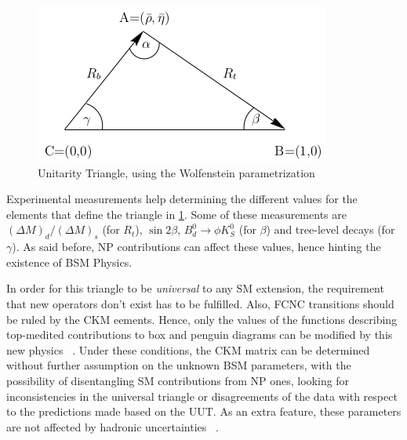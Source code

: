 \begin{figure} [htb!]
\begin{center}
\includegraphics[scale=0.7]{figs/uut.png}
\caption{Unitarity Triangle, using the Wolfenstein parametrization \label{fig:uut}}
\end{center}
\end{figure}

Experimental measurements help determining the different values for the elements that define the triangle in \ref{fig:uut}. Some of these measurements are $(\Delta M)_d/(\Delta M)_s$ (for $R_t$), $\sin{2\beta}$, $B_d^0\rightarrow \phi K_S^0$ (for $\beta$) and tree-level decays (for $\gamma$).%
As said before, NP contributions can affect these values, hence hinting the existence of BSM Physics. 

In order for this triangle to be \textit{universal} to any SM extension, the requirement that new operators don't exist has to be fulfilled. Also, FCNC transitions should be ruled by the CKM eements. Hence, only the values of the functions describing top-medited contributions to box and penguin diagrams can be modified by this new physics ~\cite{Buras:2000dm}.
Under these conditions, the CKM matrix can be determined without further assumption on the unknown BSM parameters, with the possibility of disentangling SM contributions from NP ones, looking for inconsistencies in the universal triangle or disagreements of the data with respect to the predictions made based on the UUT. As an extra feature, these parameters are not affected by hadronic uncertainties ~\cite{Buras:2000dm}. 

